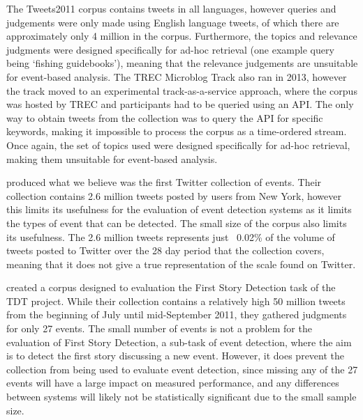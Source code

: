 The Tweets2011 corpus contains tweets in all languages, however queries and judgements were only made using English language tweets, of which there are approximately only 4 million in the corpus.
Furthermore, the topics and relevance judgments  were designed specifically for ad-hoc retrieval (one example query being `fishing guidebooks'), meaning that the relevance judgements are unsuitable for event-based analysis.
The TREC Microblog Track also ran in 2013, however the track moved to an experimental track-as-a-service approach, where the corpus was hosted by TREC and participants had to be queried using an API.
The only way to obtain tweets from the collection was to query the API for specific keywords, making it impossible to process the corpus as a time-ordered stream.
Once again, the set of topics used were designed specifically for ad-hoc retrieval, making them unsuitable for event-based analysis.

\cite{Becker:2012:ICP:2124295.2124360} produced what we believe was the first Twitter collection of events.
Their collection contains 2.6 million tweets posted by users from New York,
however this limits its usefulness for the evaluation of event detection systems as it limits the types of event that can be detected.
The small size of the corpus also limits its usefulness.
The 2.6 million tweets represents just ~0.02\% of the volume of tweets posted to Twitter over the 28 day period that the collection covers, meaning that it does not give a true representation of the scale found on Twitter.

\cite{Petrovic:2012:UPI:2382029.2382072} created a corpus designed to evaluation the First Story Detection task of the TDT project.
While their collection contains a relatively high 50 million tweets from the beginning of July until mid-September 2011, they gathered judgments for only 27 events.
The small number of events is not a problem for the evaluation of First Story Detection, a sub-task of event detection, where the aim is to detect the first story discussing a new event.
However, it does prevent the collection from being used to evaluate event detection, since missing any of the 27 events will have a large impact on measured performance, and any differences between systems will likely not be statistically significant due to the small sample size.

